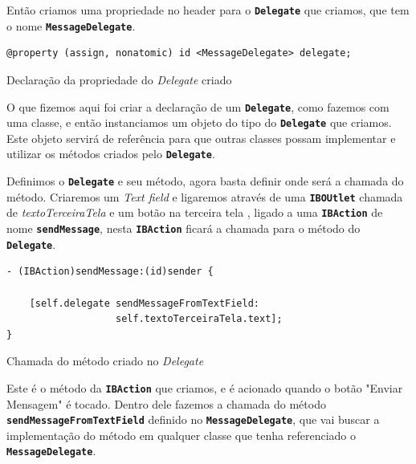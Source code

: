 \documentclass[a4paper,12pt,brazil,doubleside]{book}
\begin{document}
\begin{singlespace}
Então criamos uma propriedade no header para o \texttt{\textbf{Delegate}} que criamos, que tem o nome \texttt{\textbf{MessageDelegate}}.

\begin{listing}[H]
\begin{verbatim}
@property (assign, nonatomic) id <MessageDelegate> delegate;
\end{verbatim}
\caption{Declaração da propriedade do \emph{Delegate} criado}
\end{listing}


O que fizemos aqui foi criar a declaração de um \texttt{\textbf{Delegate}}, como fazemos com uma classe, e então instanciamos um objeto do tipo do \texttt{\textbf{Delegate}} que criamos. Este objeto servirá de referência para que outras classes possam implementar e utilizar os métodos criados pelo \texttt{\textbf{Delegate}}.

Definimos o \texttt{\textbf{Delegate}} e seu método, agora basta definir onde será a chamada do método. Criaremos um \emph{Text field} e ligaremos através de uma \texttt{\textbf{IBOUtlet}} chamada de \emph{textoTerceiraTela} e um botão na terceira tela , ligado a uma \texttt{\textbf{IBAction}} de nome \texttt{\textbf{sendMessage}}, nesta \texttt{\textbf{IBAction}} ficará a chamada para o método do \texttt{\textbf{Delegate}}.

\begin{listing}
\begin{verbatim}
- (IBAction)sendMessage:(id)sender {
    
    [self.delegate sendMessageFromTextField:
                   self.textoTerceiraTela.text];
}
\end{verbatim}
\caption{Chamada do método criado no \emph{Delegate}}
\end{listing}

Este é o método da \texttt{\textbf{IBAction}} que criamos, e é acionado quando o botão "Enviar Mensagem" é tocado. Dentro dele fazemos a chamada do método \texttt{\textbf{sendMessageFromTextField}} definido no \texttt{\textbf{MessageDelegate}}, que vai buscar a implementação do método em qualquer classe que tenha referenciado o \texttt{\textbf{MessageDelegate}}.


\end{singlespace}
\end{document}
